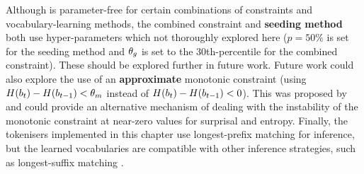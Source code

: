 Although \tokname is parameter-free for certain combinations of constraints and vocabulary-learning methods, the combined constraint and \textbf{seeding method} both use hyper-parameters which not thoroughly explored here ($p=50\%$ is set for the seeding method and $\theta_g$ is set to the 30th-percentile for the combined constraint). These should be explored further in future work. Future work could also explore the use of an \textbf{approximate} monotonic constraint (using $H(b_t) - H(b_{t-1}) < \theta_m$ instead of $H(b_t) - H(b_{t-1}) < 0$). This was proposed by \citet{pagnoni2024byte} and could provide an alternative mechanism of dealing with the instability of the monotonic constraint at near-zero values for surprisal and entropy. Finally, the tokenisers implemented in this chapter use longest-prefix matching for inference, but the learned vocabularies are compatible with other inference strategies, such as longest-suffix matching \citep{jacobs2022lost}.




